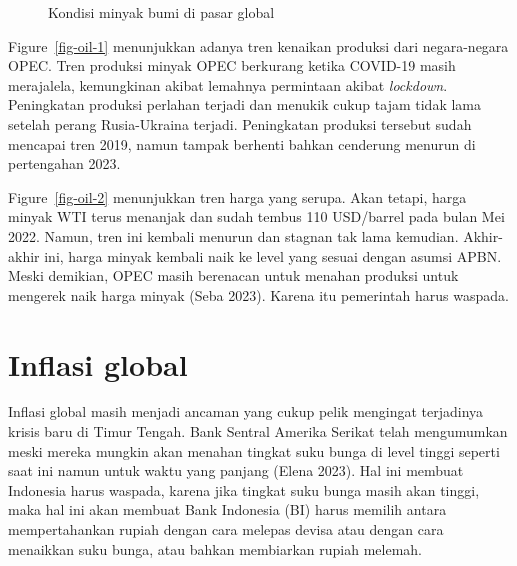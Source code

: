 \documentclass[
  a4paper,
  DIV=11,
  numbers=noendperiod]{scrreprt}
\begin{document}
\begin{figure}
\begin{minipage}[t]{0.50\linewidth}
{{}

}

\end{minipage}%

\caption{\label{fig-oil}Kondisi minyak bumi di pasar global}

\end{figure}

Figure~\ref{fig-oil-1} menunjukkan adanya tren kenaikan produksi dari
negara-negara OPEC. Tren produksi minyak OPEC berkurang ketika COVID-19
masih merajalela, kemungkinan akibat lemahnya permintaan akibat
\emph{lockdown}. Peningkatan produksi perlahan terjadi dan menukik cukup
tajam tidak lama setelah perang Rusia-Ukraina terjadi. Peningkatan
produksi tersebut sudah mencapai tren 2019, namun tampak berhenti bahkan
cenderung menurun di pertengahan 2023.

Figure~\ref{fig-oil-2} menunjukkan tren harga yang serupa. Akan tetapi,
harga minyak WTI terus menanjak dan sudah tembus 110 USD/barrel pada
bulan Mei 2022. Namun, tren ini kembali menurun dan stagnan tak lama
kemudian. Akhir-akhir ini, harga minyak kembali naik ke level yang
sesuai dengan asumsi APBN. Meski demikian, OPEC masih berenacan untuk
menahan produksi untuk mengerek naik harga minyak (Seba 2023). Karena
itu pemerintah harus waspada.

\hypertarget{inflasi-global}{%
\section{Inflasi global}\label{inflasi-global}}

Inflasi global masih menjadi ancaman yang cukup pelik mengingat
terjadinya krisis baru di Timur Tengah. Bank Sentral Amerika Serikat
telah mengumumkan meski mereka mungkin akan menahan tingkat suku bunga
di level tinggi seperti saat ini namun untuk waktu yang panjang (Elena
2023). Hal ini membuat Indonesia harus waspada, karena jika tingkat suku
bunga masih akan tinggi, maka hal ini akan membuat Bank Indonesia (BI)
harus memilih antara mempertahankan rupiah dengan cara melepas devisa
atau dengan cara menaikkan suku bunga, atau bahkan membiarkan rupiah
melemah.
\end{document}
